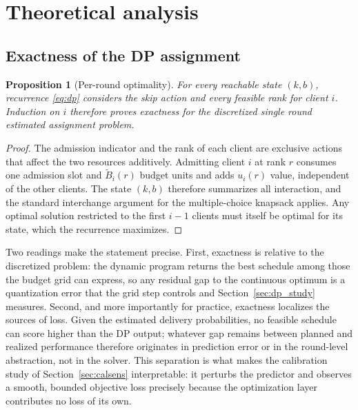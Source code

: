 \documentclass[a4paper,fleqn]{cas-dc}
\newtheorem{proposition}{Proposition}
\begin{document}
\section{Theoretical analysis}
\label{sec:theory}

\subsection{Exactness of the DP assignment}
\begin{proposition}[Per-round optimality]
\label{prop:dp}
For every reachable state $(k,b)$, recurrence \eqref{eq:dp} considers the skip action and every feasible rank for client $i$. Induction on $i$ therefore proves exactness for the discretized single round estimated assignment problem.
\end{proposition}
\begin{proof}
The admission indicator and the rank of each client are exclusive actions that affect the two resources additively. Admitting client $i$ at rank $r$ consumes one admission slot and $\widetilde B_i(r)$ budget units and adds $u_i(r)$ value, independent of the other clients. The state $(k,b)$ therefore summarizes all interaction, and the standard interchange argument for the multiple-choice knapsack applies. Any optimal solution restricted to the first $i-1$ clients must itself be optimal for its state, which the recurrence maximizes.
\end{proof}

Two readings make the statement precise. First, exactness is relative to the discretized problem: the dynamic program returns the best schedule among those the budget grid can express, so any residual gap to the continuous optimum is a quantization error that the grid step controls and Section~\ref{sec:dp_study} measures. Second, and more importantly for practice, exactness localizes the sources of loss. Given the estimated delivery probabilities, no feasible schedule can score higher than the DP output; whatever gap remains between planned and realized performance therefore originates in prediction error or in the round-level abstraction, not in the solver. This separation is what makes the calibration study of Section~\ref{sec:calsens} interpretable: it perturbs the predictor and observes a smooth, bounded objective loss precisely because the optimization layer contributes no loss of its own.
\end{document}
